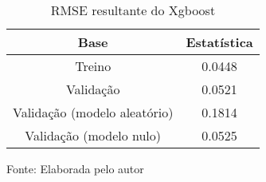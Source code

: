 
\begin{table}[h]
\centering
\caption{RMSE resultante do Xgboost}
\label{tab:cap3_rmse_xgboost}
\begin{tabular}{cc}
Base & Estatística \\
\hline
Treino & 0.0448 \\
Validação & 0.0521 \\
Validação (modelo aleatório) & 0.1814 \\
Validação (modelo nulo) & 0.0525 \\
\hline
\end{tabular}

Fonte: Elaborada pelo autor
\end{table}
